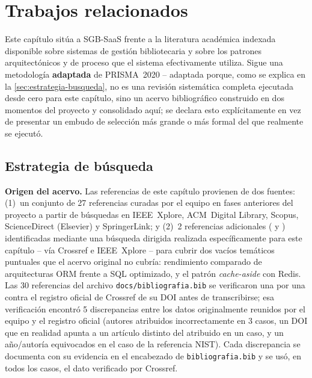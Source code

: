 \chapter{Trabajos relacionados}
\label{cap:trabajos-relacionados}

Este capítulo sitúa a SGB-SaaS frente a la literatura académica indexada
disponible sobre sistemas de gestión bibliotecaria y sobre los patrones
arquitectónicos y de proceso que el sistema efectivamente utiliza. Sigue
una metodología \textbf{adaptada} de PRISMA~2020 -- adaptada porque, como
se explica en la \autoref{sec:estrategia-busqueda}, no es una revisión
sistemática completa ejecutada desde cero para este capítulo, sino un
acervo bibliográfico construido en dos momentos del proyecto y
consolidado aquí; se declara esto explícitamente en vez de presentar un
embudo de selección más grande o más formal del que realmente se
ejecutó.

\section{Estrategia de búsqueda}
\label{sec:estrategia-busqueda}

\textbf{Origen del acervo.} Las referencias de este capítulo provienen de
dos fuentes: (1)~un conjunto de 27 referencias curadas por el equipo en
fases anteriores del proyecto a partir de búsquedas en IEEE~Xplore,
ACM~Digital Library, Scopus, ScienceDirect (Elsevier) y SpringerLink; y
(2)~2 referencias adicionales (\citet{colley2018ormperformance} y
\citet{kusuma2017rediscaching}) identificadas mediante una búsqueda
dirigida realizada específicamente para este capítulo -- vía Crossref e
IEEE~Xplore -- para cubrir dos vacíos temáticos puntuales que el acervo
original no cubría: rendimiento comparado de arquitecturas ORM frente a
SQL optimizado, y el patrón \emph{cache-aside} con Redis. Las 30
referencias del archivo \texttt{docs/bibliografia.bib} se verificaron
una por una contra el registro oficial de Crossref de su DOI antes de
transcribirse; esa verificación encontró 5 discrepancias entre los datos
originalmente reunidos por el equipo y el registro oficial (autores
atribuidos incorrectamente en 3 casos, un DOI que en realidad apunta a
un artículo distinto del atribuido en un caso, y un año/autoría
equivocados en el caso de la referencia NIST). Cada discrepancia se
documenta con su evidencia en el encabezado de \texttt{bibliografia.bib}
y se usó, en todos los casos, el dato verificado por Crossref.

